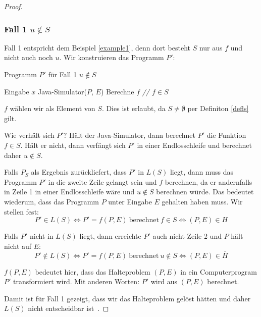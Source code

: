 \documentclass[journal]{IEEEtran}
\begin{document}
\begin{proof}
\subsubsection{Fall 1 $u \notin S$}

Fall 1 entspricht dem Beispiel \ref{example1}, denn dort besteht $S$ nur aus $f$ und nicht auch noch $u$. Wir konstruieren das Programm $P'$:

\begin{algorithm}[H]
\caption{Programm $P'$ für Fall 1 $u \notin S$}
\begin{algorithmic}[1]
\renewcommand{\algorithmicrequire}{\textbf{Input:}}
\renewcommand{\algorithmicensure}{\textbf{Output:}}
\REQUIRE Eingabe $x$
\STATE Java-Simulator($P$, $E$)
\STATE Berechne $f$ \textit{// $f \in S$}
\end{algorithmic}
\end{algorithm}

$f$ wählen wir als Element von $S$. Dies ist erlaubt, da $S \ne \emptyset$ per Definiton \ref{defls} gilt.

Wie verhält sich $P'$? Hält der Java-Simulator, dann berechnet $P'$ die Funktion $f \in S$. Hält er nicht, dann verfängt sich $P'$ in einer Endlosschleife und berechnet daher $u \notin S$.

Falls $P_S$ als Ergebnis zurückliefert, dass $P'$ in $L(S)$ liegt, dann muss das Programm $P'$ in die zweite Zeile gelangt sein und $f$ berechnen, da er andernfalls in Zeile 1 in einer Endlosschleife wäre und $u \notin S$ berechnen würde. Das bedeutet wiederum, dass das Programm $P$ unter Eingabe $E$ gehalten haben muss. Wir stellen fest:
\begin{equation*}
P' \in L(S) \Leftrightarrow P' = f(P, E) \ \text{berechnet} \ f \in S \Leftrightarrow (P, E) \in H
\end{equation*}

Falls $P'$ nicht in $L(S)$ liegt, dann erreichte $P'$ auch nicht Zeile 2 und $P$ hält nicht auf $E$:
\begin{equation*}
P' \notin L(S) \Leftrightarrow P' = f(P, E) \ \text{berechnet} \ u \notin S \Leftrightarrow (P, E) \in \overline{H}
\end{equation*}

$f(P, E)$ bedeutet hier, dass das Halteproblem $(P, E)$ in ein Computerprogram $P'$ transformiert wird. Mit anderen Worten: $P'$ wird aus $(P, E)$ berechnet.

Damit ist für Fall 1 gezeigt, dass wir das Halteproblem gelöst hätten und daher $L(S)$ nicht entscheidbar ist~\cite{satzvonricebeweis}.


\end{proof}
\end{document}
